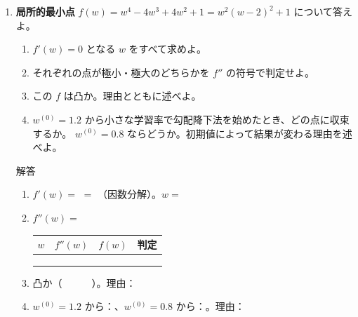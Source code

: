 \documentclass[a4paper,dvipdfmx]{jsarticle}
\newcommand{\提出期限}{2026年10月26日（月）}
\newcommand{\学籍番号}{0000000}
\newcommand{\氏名}{氏名を書く}
\newcommand{\提出日}{2026年10月26日}
\newenvironment{answer}{\begin{itembox}[l]{解答}}{\end{itembox}}
\begin{document}
\begin{enumerate}
  \item \textbf{局所的最小点}\quad
    $f(w) = w^4 - 4w^3 + 4w^2 + 1 = w^2(w - 2)^2 + 1$ について答えよ。
    \begin{enumerate}
      \item $f'(w) = 0$ となる $w$ をすべて求めよ。
      \item それぞれの点が極小・極大のどちらかを $f''$ の符号で判定せよ。
      \item この $f$ は凸か。理由とともに述べよ。
      \item $w^{(0)} = 1.2$ から小さな学習率で勾配降下法を始めたとき、どの点に収束するか。
        $w^{(0)} = 0.8$ ならどうか。初期値によって結果が変わる理由を述べよ。
    \end{enumerate}
    \begin{answer}
      \begin{enumerate}
        \item $f'(w) = $ \phantom{XXXXXXXXXXXX} $=$ \phantom{XXXXXXXXXX}（因数分解）。$w = $ \phantom{XXXXXX}
        \item $f''(w) = $ \phantom{XXXXXXXX}
          \begin{center}
            \begin{tabular}{c|c|c|l}
              \hline
              $w$ & $f''(w)$ & $f(w)$ & 判定 \\
              \hline
              \phantom{X} & \phantom{XXXXX} & \phantom{XX} & \phantom{XXXX} \\
              \phantom{X} & \phantom{XXXXX} & \phantom{XX} & \phantom{XXXX} \\
              \phantom{X} & \phantom{XXXXX} & \phantom{XX} & \phantom{XXXX} \\
              \hline
            \end{tabular}
          \end{center}
        \item 凸か（　　　）。理由：
          \vspace{10mm}
        \item $w^{(0)} = 1.2$ から：\phantom{XXXX}、$w^{(0)} = 0.8$ から：\phantom{XXXX}。理由：
          \vspace{14mm}
      \end{enumerate}
    \end{answer}


\end{enumerate}
\end{document}
